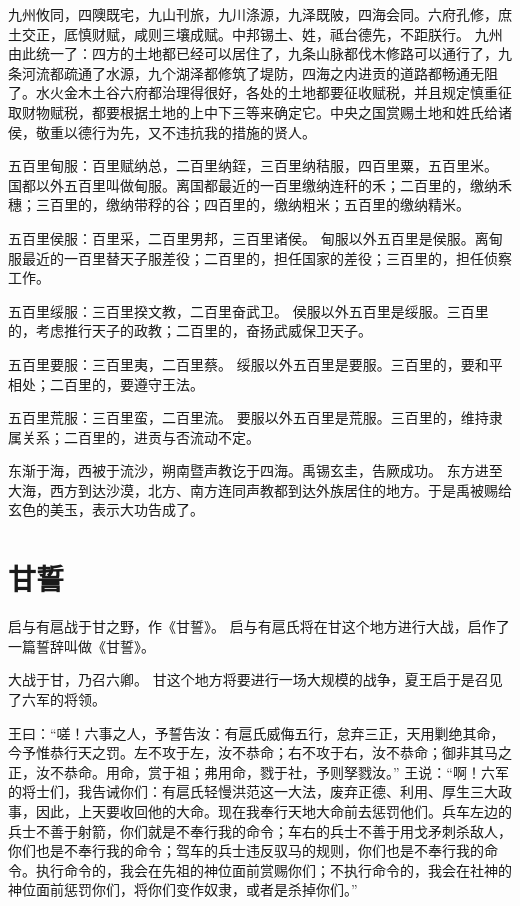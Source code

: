 \documentclass[12pt,UTF8]{ctexbook}
\begin{document}
九州攸同，四隩既宅，九山刊旅，九川涤源，九泽既陂，四海会同。六府孔修，庶土交正，厎慎财赋，咸则三壤成赋。中邦锡土、姓，祗台德先，不距朕行。
九州由此统一了：四方的土地都已经可以居住了，九条山脉都伐木修路可以通行了，九条河流都疏通了水源，九个湖泽都修筑了堤防，四海之内进贡的道路都畅通无阻了。水火金木土谷六府都治理得很好，各处的土地都要征收赋税，并且规定慎重征取财物赋税，都要根据土地的上中下三等来确定它。中央之国赏赐土地和姓氏给诸侯，敬重以德行为先，又不违抗我的措施的贤人。

五百里甸服：百里赋纳总，二百里纳銍，三百里纳秸服，四百里粟，五百里米。
国都以外五百里叫做甸服。离国都最近的一百里缴纳连秆的禾；二百里的，缴纳禾穗；三百里的，缴纳带稃的谷；四百里的，缴纳粗米；五百里的缴纳精米。

五百里侯服：百里采，二百里男邦，三百里诸侯。
甸服以外五百里是侯服。离甸服最近的一百里替天子服差役；二百里的，担任国家的差役；三百里的，担任侦察工作。

五百里绥服：三百里揆文教，二百里奋武卫。
侯服以外五百里是绥服。三百里的，考虑推行天子的政教；二百里的，奋扬武威保卫天子。

五百里要服：三百里夷，二百里蔡。
绥服以外五百里是要服。三百里的，要和平相处；二百里的，要遵守王法。

五百里荒服：三百里蛮，二百里流。
要服以外五百里是荒服。三百里的，维持隶属关系；二百里的，进贡与否流动不定。

东渐于海，西被于流沙，朔南暨声教讫于四海。禹锡玄圭，告厥成功。
东方进至大海，西方到达沙漠，北方、南方连同声教都到达外族居住的地方。于是禹被赐给玄色的美玉，表示大功告成了。

\chapter{甘誓}

启与有扈战于甘之野，作《甘誓》。
启与有扈氏将在甘这个地方进行大战，启作了一篇誓辞叫做《甘誓》。

大战于甘，乃召六卿。
甘这个地方将要进行一场大规模的战争，夏王启于是召见了六军的将领。

王曰：“嗟！六事之人，予誓告汝：有扈氏威侮五行，怠弃三正，天用剿绝其命，今予惟恭行天之罚。左不攻于左，汝不恭命；右不攻于右，汝不恭命；御非其马之正，汝不恭命。用命，赏于祖；弗用命，戮于社，予则孥戮汝。”
王说：“啊！六军的将士们，我告诫你们：有扈氏轻慢洪范这一大法，废弃正德、利用、厚生三大政事，因此，上天要收回他的大命。现在我奉行天地大命前去惩罚他们。兵车左边的兵士不善于射箭，你们就是不奉行我的命令；车右的兵士不善于用戈矛刺杀敌人，你们也是不奉行我的命令；驾车的兵士违反驭马的规则，你们也是不奉行我的命令。执行命令的，我会在先祖的神位面前赏赐你们；不执行命令的，我会在社神的神位面前惩罚你们，将你们变作奴隶，或者是杀掉你们。”
\end{document}
